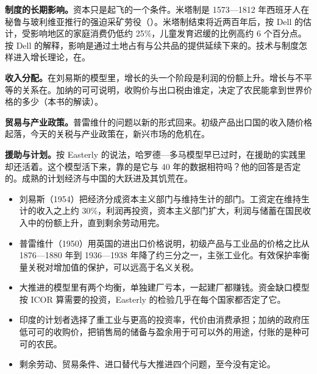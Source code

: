 \textbf{制度的长期影响。}资本只是起飞的一个条件。米塔制是 1573—1812 年西班牙人在秘鲁与玻利维亚推行的强迫采矿劳役（）\cite{dell2010}。米塔制结束将近两百年后，按 Dell 的估计，受影响地区的家庭消费仍低约 25\%，儿童发育迟缓的比例高约 6 个百分点\cite{dell2010}。按 Dell 的解释，影响是通过土地占有与公共品的提供延续下来的\cite{dell2010}。技术与制度怎样进入增长理论，在。

\textbf{收入分配。}在刘易斯的模型里，增长的头一个阶段是利润的份额上升。增长与不平等的关系在。加纳的可可说明，收购价与出口税由谁定，决定了农民能拿到世界价格的多少（本书的解读）。

\textbf{贸易与产业政策。}普雷维什的问题以新的形式回来。初级产品出口国的收入随价格起落，今天的关税与产业政策在，新兴市场的危机在。

\textbf{援助与计划。}按 Easterly 的说法，哈罗德—多马模型早已过时，在援助的实践里却还活着\cite{easterly1997}。这个模型活下来，靠的是它与 40 年的数据相符吗？他的回答是否定的\cite{easterly1997}。成熟的计划经济与中国的大跃进及其饥荒在。

\begin{takeaways}
\begin{itemize}
\item 刘易斯（1954）把经济分成资本主义部门与维持生计的部门。工资定在维持生计的收入之上约 30\%，利润再投资，资本主义部门扩大，利润与储蓄在国民收入中的份额上升，直到剩余劳动用完。
\item 普雷维什（1950）用英国的进出口价格说明，初级产品与工业品的价格之比从 1876—1880 年到 1936—1938 年降了约三分之一，主张工业化。有效保护率衡量关税对增加值的保护，可以远高于名义关税。
\item 大推进的模型里有两个均衡，单独建厂亏本，一起建厂都赚钱。资金缺口模型按 ICOR 算需要的投资，Easterly 的检验几乎在每个国家都否定了它。
\item 印度的计划者选择了重工业与更高的投资率，代价由消费承担；加纳的政府压低可可的收购价，把销售局的储备与盈余用于可可以外的用途，付账的是种可可的农民。
\item 剩余劳动、贸易条件、进口替代与大推进四个问题，至今没有定论。
\end{itemize}
\end{takeaways}

